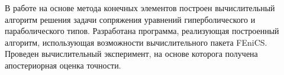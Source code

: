 \newpage

\begin{center}
\end{center}

В работе на основе метода конечных элементов построен вычислительный алгоритм решения задачи 
сопряжения уравнений гиперболического и параболического типов. Разработана программа, реализующая
построенный алгоритм, использующая возможности вычислительного пакета FEniCS. Проведен вычислительный 
эксперимент, на основе которога получена апостериорная оценка точности.

\newpage

